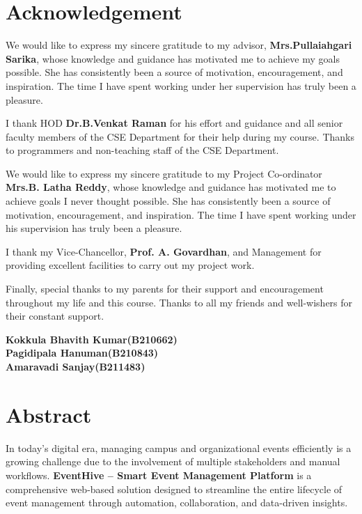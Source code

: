 \documentclass[12pt,a4paper]{report}
\begin{document}
\chapter*{Acknowledgement}

We would like to express my sincere gratitude to my advisor, \textbf{Mrs.Pullaiahgari Sarika}, whose knowledge and guidance has motivated me to achieve my goals possible. She has consistently been a source of motivation, encouragement, and inspiration. The time I have spent working under her supervision has truly been a pleasure.

\vspace{0.5cm}

I thank HOD \textbf{Dr.B.Venkat Raman} for his effort and guidance and all senior faculty members of the CSE Department for their help during my course. Thanks to programmers and non-teaching staff of the CSE Department.

\vspace{0.5cm}

We would like to express my sincere gratitude to my Project Co-ordinator \textbf{Mrs.B. Latha Reddy}, whose knowledge and guidance has motivated me to achieve goals I never thought possible. She has consistently been a source of motivation, encouragement, and inspiration. The time I have spent working under his supervision has truly been a pleasure.

\vspace{0.5cm}

I thank my Vice-Chancellor,\textbf{ Prof. A. Govardhan}, and Management for providing excellent facilities to carry out my project work.

\vspace{0.5cm}

Finally, special thanks to my parents for their support and encouragement throughout my life and this course. Thanks to all my friends and well-wishers for their constant support.

\vspace{1cm}

\begin{flushright}
\textbf{Kokkula Bhavith Kumar(B210662)}\\
\textbf{Pagidipala Hanuman(B210843)}\\
\textbf{Amaravadi Sanjay(B211483)}
\end{flushright}
\clearpage

\chapter*{Abstract}
\noindent
In today’s digital era, managing campus and organizational events efficiently is a growing challenge due to the involvement of multiple stakeholders and manual workflows. \textbf{EventHive – Smart Event Management Platform} is a comprehensive web-based solution designed to streamline the entire lifecycle of event management through automation, collaboration, and data-driven insights.
\end{document}
